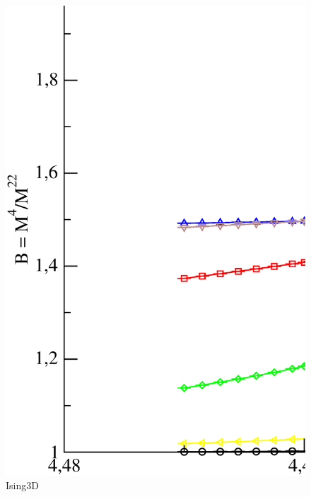 \begin{figure}[!htpb]
  \centering
  \includegraphics[width=15cm]{./plots/Ising3D/Ising3D_BinderCumulant_vs_Temperature.eps}
  \caption{Ising3D}
\end{figure}


